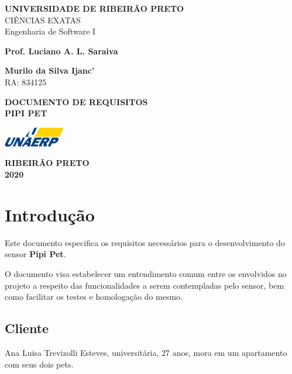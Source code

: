 \documentclass[12pt,a4paper]{article}
\let\oldsection\section
\renewcommand\section{\clearpage\oldsection}
\begin{document}
\begin{titlepage}
	\begin{center}
		\textbf{UNIVERSIDADE DE RIBEIRÃO PRETO} \\
			CIÊNCIAS EXATAS \\
			Engenharia de Software I

			\vspace{1.5cm}

			\textbf{Prof. Luciano A. L. Saraiva}
			\vspace{0.5cm}

			\textbf{Murilo da Silva Ijanc'} \\
			RA: 834125

			\vspace{6.5cm}

			\textbf{DOCUMENTO DE REQUISITOS} \\
			\textbf{PIPI PET}

			\vfill

			\vspace{0.8cm}

			\includegraphics[width=0.2\textwidth]{unaerp}

			\textbf{RIBEIRÃO PRETO} \\
			\textbf{2020}
	\end{center}
\end{titlepage}


\thispagestyle{empty}

\tableofcontents

\newpage

\thispagestyle{empty}
\listoftables
\thispagestyle{empty}
\listoffigures
\thispagestyle{empty}
\printglossary[type=main,style=long,nonumberlist]


\section{Introdução}
Este documento especifica os requisitos necessários para o desenvolvimento do
sensor \textbf{Pipi Pet}.

O documento visa estabelecer um entendimento comum entre os envolvidos no
projeto a respeito das funcionalidades a serem contempladas pelo sensor, bem
como facilitar os testes e homologação do mesmo.

\subsection{Cliente}
Ana Luisa Trevizolli Esteves, universitária, 27 anos, mora em um apartamento
com seus dois pets.
\end{document}
